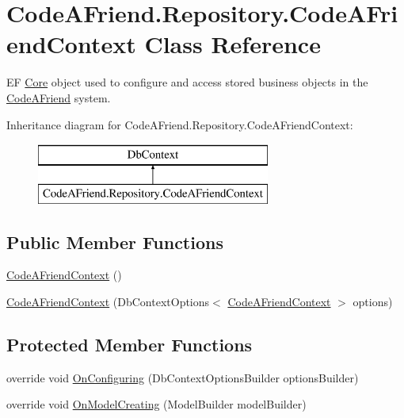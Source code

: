 \hypertarget{class_code_a_friend_1_1_repository_1_1_code_a_friend_context}{}\section{Code\+A\+Friend.\+Repository.\+Code\+A\+Friend\+Context Class Reference}
\label{class_code_a_friend_1_1_repository_1_1_code_a_friend_context}


EF \mbox{\hyperlink{namespace_code_a_friend_1_1_core}{Core}} object used to configure and access stored business objects in the \mbox{\hyperlink{namespace_code_a_friend}{Code\+A\+Friend}} system. 


Inheritance diagram for Code\+A\+Friend.\+Repository.\+Code\+A\+Friend\+Context\+:\begin{figure}[H]
\begin{center}
\leavevmode
\includegraphics[height=2.000000cm]{class_code_a_friend_1_1_repository_1_1_code_a_friend_context}
\end{center}
\end{figure}
\subsection*{Public Member Functions}
\begin{DoxyCompactItemize}
\item 
\mbox{\hyperlink{class_code_a_friend_1_1_repository_1_1_code_a_friend_context_a76820d5c0525ba70dbf679fe5bc3a744}{Code\+A\+Friend\+Context}} ()
\item 
\mbox{\hyperlink{class_code_a_friend_1_1_repository_1_1_code_a_friend_context_a48086a6d09a4cd0604f5aaf4a0c7a220}{Code\+A\+Friend\+Context}} (Db\+Context\+Options$<$ \mbox{\hyperlink{class_code_a_friend_1_1_repository_1_1_code_a_friend_context}{Code\+A\+Friend\+Context}} $>$ options)
\end{DoxyCompactItemize}
\subsection*{Protected Member Functions}
\begin{DoxyCompactItemize}
\item 
override void \mbox{\hyperlink{class_code_a_friend_1_1_repository_1_1_code_a_friend_context_a7465fc81cf21b6bf649a5265aea7c454}{On\+Configuring}} (Db\+Context\+Options\+Builder options\+Builder)
\item 
override void \mbox{\hyperlink{class_code_a_friend_1_1_repository_1_1_code_a_friend_context_aede2ea79950908629468b17b4a53ec04}{On\+Model\+Creating}} (Model\+Builder model\+Builder)
\end{DoxyCompactItemize}

